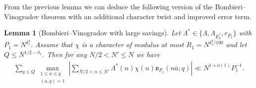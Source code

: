 \documentclass[12pt]{amsart}
\newtheorem{lemma}[theorem]{Lemma}
\theoremstyle{definition}
\theoremstyle{remark}
\numberwithin{equation}{section}
\newcommand{\1}{\mathbf{1}}
\begin{document}
  
From the previous lemma we can deduce the following version of the Bombieri--Vinogradov theorem with an additional character twist and improved error term.

\begin{lemma}[Bombieri--Vinogradov with large savings]\label{le_BV_rough} Let  $\Lambda^* \in \{\Lambda,\Lambda_{E_3^*},r_{P_1} \}$ with $P_1=N^{\delta_1^4}$. Assume that $\chi$ is a character of modulus at most $R_1=N^{\delta_1^4/100}$ and let $Q\leq N^{1/2-\delta_1}$. Then for any $N/2<N'\leq N$ we have 
	\begin{align*}
	\sum_{q\leq Q}\max_{\substack{1\leq a\leq q\\ (a,q)=1}} \left|\sum_{N/2<n\leq N'} \Lambda^*(n)\chi(n)\mathfrak{v}_{P_1}(n\overline{a};q) \right|\ll N^{1+o(1)}P_1^{-1}.
	\end{align*}
\end{lemma}
\end{document}
